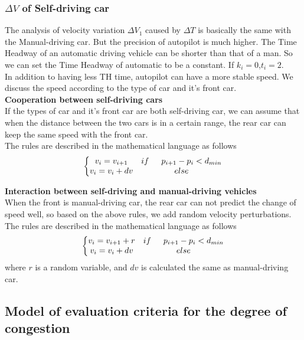 \documentclass[UTF8]{mcmthesis}
\begin{document}
\subsubsection{$\Delta V$ of Self-driving car}
The analysis of velocity variation $\Delta V_{1}$ caused by $\Delta T$ is basically the same with the Manual-driving car. But the precision of autopilot is much higher. The Time Headway of an automatic driving vehicle can be shorter than that of a man. So we can set the Time Headway of automatic to be a constant. If $k_i=0$,$t_i=2$.\\
\indent In addition to having less TH time, autopilot can have a more stable speed. We discuss the speed according to the type of car and it's front car.\\

\textbf{Cooperation between self-driving cars \\}
\indent If the types of car and it's front car are both self-driving car, we can assume that when the distance between the two cars is in a certain range, the rear car can keep the same speed with the front car.\\
\indent The rules are described in the mathematical language as follows
\begin{equation}
\left\{\begin{matrix}
v_i=v_{i+1} &if\indent p_{i+1}-p_{i}<d_{min} \\ 
v_i=v_i+dv& else
\end{matrix}\right.
\end{equation}

\textbf{Interaction between self-driving and manual-driving vehicles \\}
\indent When the front is manual-driving car, the rear car can not predict the change of speed well, so based on the above rules, we add random velocity perturbations.
\indent The rules are described in the mathematical language as follows
\begin{equation}
\left\{\begin{matrix}
	v_i=v_{i+1}+r &if\indent p_{i+1}-p_{i}<d_{min} \\ 
	v_i=v_i+dv& else
\end{matrix}\right.
\end{equation}
where $r$ is a random variable, and $dv$ is calculated the same as manual-driving car.
\subsection{Model of evaluation criteria for the degree of congestion}
\label{evaluation criteria}
\end{document}
